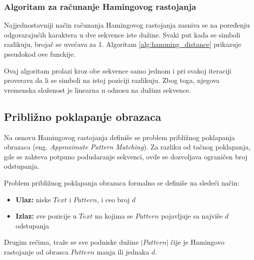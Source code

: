 \documentclass[12pt,oneside]{memoir}
\begin{document}
\subsubsection{Algoritam za računanje Hamingovog rastojanja}

Najjednostavniji način računanja Hamingovog rastojanja zasniva se na poređenju odgovarajućih karaktera u dve sekvence iste dužine. Svaki put kada se simboli razlikuju, brojač se uvećava za 1. Algoritam \ref{alg:hamming_distance} prikazuje pseudokod ove funckije.

\begin{algorithm}[h]
\caption{Hamming Distance}
\label{alg:hamming_distance}
\SetAlgoLined
\DontPrintSemicolon
{}
\end{algorithm}

Ovaj algoritam prolazi kroz obe sekvence samo jednom i pri svakoj iteraciji proverava da li se simboli na istoj poziciji razlikuju. Zbog toga, njegova vremenska složenost je linearna u odnosu na dužinu sekvence.

\subsection{Približno poklapanje obrazaca}

Na osnovu Hamingovog rastojanja definiše se problem približnog poklapanja obrazaca (eng. \textit{Approximate Pattern Matching}). Za razliku od tačnog poklapanja, gde se zahteva potpuno podudaranje sekvenci, ovde se dozvoljava ograničen broj odstupanja.

Problem približnog poklapanja obrazaca formalno se definiše na sledeći način:

\begin{itemize}

\item\textbf{Ulaz:} niske $Text$ i $Pattern$, i ceo broj $d$ 

\item\textbf{Izlaz:} sve pozicije u $Text$ na kojima se $Pattern$ pojavljuje sa najviše $d$ odstupanja
\end{itemize}
Drugim rečima, traže se sve podniske dužine $|Pattern|$ čije je Hamingovo rastojanje od obrasca $Pattern$ manja ili jednaka $d$.
\end{document}
